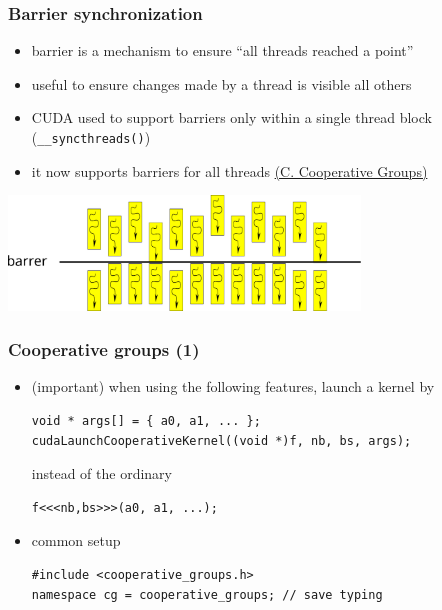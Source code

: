 \documentclass[12pt,dvipdfmx]{beamer}
\begin{document}
\begin{frame}
\frametitle{Barrier synchronization}
\begin{itemize}
\item barrier is a mechanism to ensure
  ``all threads reached a point''
\item useful to ensure changes made by a thread is visible all others
\item CUDA used to support barriers only within a single thread block
  ({\tt \_\_syncthreads()})
\item it now supports barriers for all threads 
  \href{https://docs.nvidia.com/cuda/cuda-c-programming-guide/index.html\#cooperative-groups}{(C. Cooperative Groups)}
\end{itemize}

\begin{center}
\includegraphics[width=0.7\textwidth]{out/pdf/svg/barrier.pdf}
\end{center}
\end{frame}

\begin{frame}[fragile]
\frametitle{Cooperative groups (1)}
\begin{itemize}
\item (important) when using the following features, launch a kernel by
\begin{lstlisting}
void * args[] = { a0, a1, ... };
cudaLaunchCooperativeKernel((void *)f, nb, bs, args);
\end{lstlisting}
instead of the ordinary
\begin{lstlisting}
f<<<nb,bs>>>(a0, a1, ...);
\end{lstlisting}

\item common setup
\begin{lstlisting}
#include <cooperative_groups.h>
namespace cg = cooperative_groups; // save typing
\end{lstlisting}
\end{itemize}
\end{frame}
\end{document}
